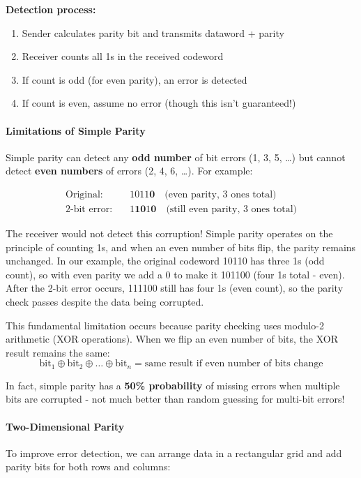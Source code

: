 \textbf{Detection process:}
\begin{enumerate}
    \item Sender calculates parity bit and transmits dataword + parity
    \item Receiver counts all 1s in the received codeword
    \item If count is odd (for even parity), an error is detected
    \item If count is even, assume no error (though this isn't guaranteed!)
\end{enumerate}

\paragraph{Limitations of Simple Parity}
Simple parity can detect any \textbf{odd number} of bit errors (1, 3, 5, \ldots) but cannot detect \textbf{even numbers} of errors (2, 4, 6, \ldots). For example:

\begin{align*}
\text{Original:} \quad &1011\mathbf{0} \quad \text{(even parity, 3 ones total)}\\
\text{2-bit error:} \quad &1\mathbf{1}\mathbf{0}1\mathbf{0} \quad \text{(still even parity, 3 ones total)}
\end{align*}

The receiver would not detect this corruption! Simple parity operates on the principle of counting 1s, and when an even number of bits flip, the parity remains unchanged. In our example, the original codeword 10110 has three 1s (odd count), so with even parity we add a 0 to make it 101100 (four 1s total - even). After the 2-bit error occurs, 111100 still has four 1s (even count), so the parity check passes despite the data being corrupted.

This fundamental limitation occurs because parity checking uses modulo-2 arithmetic (XOR operations). When we flip an even number of bits, the XOR result remains the same:
\[
\text{bit}_1 \oplus \text{bit}_2 \oplus \ldots \oplus \text{bit}_n = \text{same result if even number of bits change}
\]

In fact, simple parity has a \textbf{50\% probability} of missing errors when multiple bits are corrupted - not much better than random guessing for multi-bit errors!

\paragraph{Two-Dimensional Parity}
To improve error detection, we can arrange data in a rectangular grid and add parity bits for both rows and columns:

